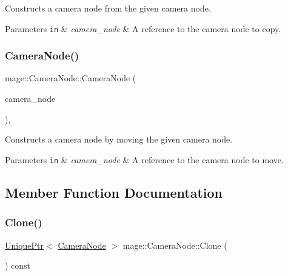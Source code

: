 Constructs a camera node from the given camera node.


\begin{DoxyParams}[1]{Parameters}
\mbox{\tt in}  & {\em camera\+\_\+node} & A reference to the camera node to copy. \\
\hline
\end{DoxyParams}
\hypertarget{classmage_1_1_camera_node_af46b911ecf12ed7c3cb31fb98a590fc1}{}\label{classmage_1_1_camera_node_af46b911ecf12ed7c3cb31fb98a590fc1} 
\subsubsection{\texorpdfstring{Camera\+Node()}{CameraNode()}\hspace{0.1cm}{\footnotesize\ttfamily [3/3]}}
{\footnotesize\ttfamily mage\+::\+Camera\+Node\+::\+Camera\+Node (\begin{DoxyParamCaption}\item[{\hyperlink{classmage_1_1_camera_node}{Camera\+Node} \&\&}]{camera\+\_\+node }\end{DoxyParamCaption})\hspace{0.3cm}{\ttfamily [protected]}, {\ttfamily [default]}}

Constructs a camera node by moving the given camera node.


\begin{DoxyParams}[1]{Parameters}
\mbox{\tt in}  & {\em camera\+\_\+node} & A reference to the camera node to move. \\
\hline
\end{DoxyParams}


\subsection{Member Function Documentation}
\hypertarget{classmage_1_1_camera_node_a6c636830efadf9753f2f0d012153d61f}{}\label{classmage_1_1_camera_node_a6c636830efadf9753f2f0d012153d61f} 
\subsubsection{\texorpdfstring{Clone()}{Clone()}}
{\footnotesize\ttfamily \hyperlink{namespacemage_a3316d7143a973e37adf1110f2e80ca31}{Unique\+Ptr}$<$ \hyperlink{classmage_1_1_camera_node}{Camera\+Node} $>$ mage\+::\+Camera\+Node\+::\+Clone (\begin{DoxyParamCaption}{ }\end{DoxyParamCaption}) const}

